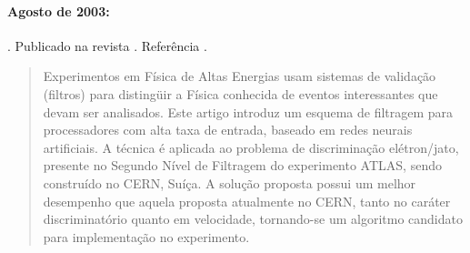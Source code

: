 \paragraph{Agosto de 2003: }. Publicado
na revista . Referência
\cite{aa:nima-2003}. 

\begin{quotation}
Experimentos em Física de Altas Energias usam sistemas de validação
 (filtros) para distingüir a Física conhecida de eventos
interessantes que devam ser analisados. Este artigo introduz um esquema de
filtragem para processadores com alta taxa de entrada, baseado em redes
neurais artificiais. A técnica é aplicada ao problema de discriminação
elétron/jato, presente no Segundo Nível de Filtragem do experimento ATLAS,
sendo construído no CERN, Suíça. A solução proposta possui um melhor
desempenho que aquela proposta atualmente no CERN, tanto no caráter
discriminatório quanto em velocidade, tornando-se um algoritmo candidato para
implementação no experimento.
\end{quotation}





